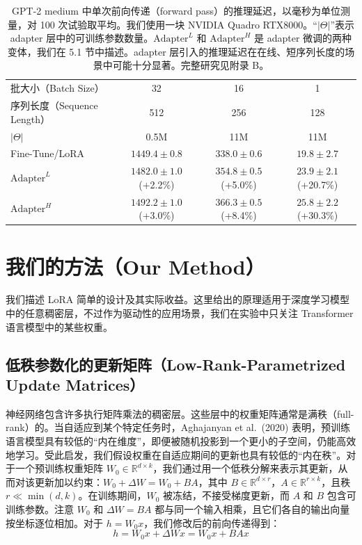 \documentclass[11pt,UTF8,fontset=fandol]{ctexart}
\newcommand{\bbR}{\mathbb{R}}
\begin{document}
\begin{table}[H]\centering
\caption{GPT-2 medium 中单次前向传递（forward pass）的推理延迟，以毫秒为单位测量，对 100 次试验取平均。我们使用一块 NVIDIA Quadro RTX8000。“$|\Theta|$”表示 adapter 层中的可训练参数数量。$\text{Adapter}^L$ 和 $\text{Adapter}^H$ 是 adapter 微调的两种变体，我们在 5.1 节中描述。adapter 层引入的推理延迟在在线、短序列长度的场景中可能十分显著。完整研究见附录 B。}
\label{tab:1}
\begin{tabular}{lccc}
\toprule
批大小（Batch Size） & 32 & 16 & 1 \\
序列长度（Sequence Length） & 512 & 256 & 128 \\
$|\Theta|$ & 0.5M & 11M & 11M \\
\midrule
Fine-Tune/LoRA & $1449.4\pm0.8$ & $338.0\pm0.6$ & $19.8\pm2.7$ \\
$\text{Adapter}^L$ & $1482.0\pm1.0$ (+2.2\%) & $354.8\pm0.5$ (+5.0\%) & $23.9\pm2.1$ (+20.7\%) \\
$\text{Adapter}^H$ & $1492.2\pm1.0$ (+3.0\%) & $366.3\pm0.5$ (+8.4\%) & $25.8\pm2.2$ (+30.3\%) \\
\bottomrule
\end{tabular}
\end{table}

\section{我们的方法（Our Method）}

我们描述 LoRA 简单的设计及其实际收益。这里给出的原理适用于深度学习模型中的任意稠密层，不过作为驱动性的应用场景，我们在实验中只关注 Transformer 语言模型中的某些权重。

\subsection{低秩参数化的更新矩阵（Low-Rank-Parametrized Update Matrices）}

神经网络包含许多执行矩阵乘法的稠密层。这些层中的权重矩阵通常是满秩（full-rank）的。当自适应到某个特定任务时，Aghajanyan et al.\ (2020) 表明，预训练语言模型具有较低的“内在维度”，即便被随机投影到一个更小的子空间，仍能高效地学习。受此启发，我们假设权重在自适应期间的更新也具有较低的“内在秩”。对于一个预训练权重矩阵 $W_0\in\bbR^{d\times k}$，我们通过用一个低秩分解来表示其更新，从而对该更新加以约束：$W_0+\Delta W=W_0+BA$，其中 $B\in\bbR^{d\times r}$，$A\in\bbR^{r\times k}$，且秩 $r\ll\min(d,k)$。在训练期间，$W_0$ 被冻结，不接受梯度更新，而 $A$ 和 $B$ 包含可训练参数。注意 $W_0$ 和 $\Delta W=BA$ 都与同一个输入相乘，且它们各自的输出向量按坐标逐位相加。对于 $h=W_0x$，我们修改后的前向传递得到：
\begin{equation}
h=W_0x+\Delta Wx=W_0x+BAx\tag{3}
\end{equation}
\end{document}
